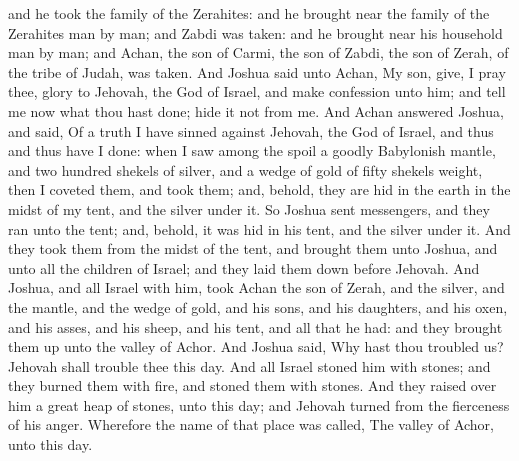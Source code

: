 and he took the family of the Zerahites: and he brought near the family of the Zerahites man by man; and Zabdi was taken: and he brought near his household man by man; and Achan, the son of Carmi, the son of Zabdi, the son of Zerah, of the tribe of Judah, was taken. And Joshua said unto Achan, My son, give, I pray thee, glory to Jehovah, the God of Israel, and make confession unto him; and tell me now what thou hast done; hide it not from me. And Achan answered Joshua, and said, Of a truth I have sinned against Jehovah, the God of Israel, and thus and thus have I done: when I saw among the spoil a goodly Babylonish mantle, and two hundred shekels of silver, and a wedge of gold of fifty shekels weight, then I coveted them, and took them; and, behold, they are hid in the earth in the midst of my tent, and the silver under it.  So Joshua sent messengers, and they ran unto the tent; and, behold, it was hid in his tent, and the silver under it. And they took them from the midst of the tent, and brought them unto Joshua, and unto all the children of Israel; and they laid them down before Jehovah. And Joshua, and all Israel with him, took Achan the son of Zerah, and the silver, and the mantle, and the wedge of gold, and his sons, and his daughters, and his oxen, and his asses, and his sheep, and his tent, and all that he had: and they brought them up unto the valley of Achor. And Joshua said, Why hast thou troubled us? Jehovah shall trouble thee this day. And all Israel stoned him with stones; and they burned them with fire, and stoned them with stones. And they raised over him a great heap of stones, unto this day; and Jehovah turned from the fierceness of his anger. Wherefore the name of that place was called, The valley of Achor, unto this day. 

